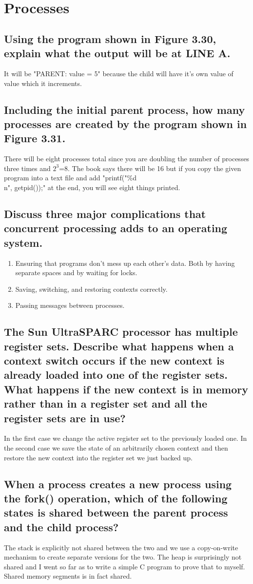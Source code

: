 \documentclass{book}%
\begin{document}
\chapter{Processes}
\section{Using the program shown in Figure 3.30, explain what the output will be
at LINE A.}
It will be "PARENT: value = 5" because the child will have it's own value of 
value which it increments.
\section{Including the initial parent process, how many processes are created by
the program shown in Figure 3.31.}
There will be eight processes total since you are doubling the number of
processes three times and $2^3$=8. The book says there will be 16 but if you 
copy the given program into a text file and add "printf("\%d\\n", getpid());" at
the end, you will see eight things printed. 
\section{Discuss three major complications that concurrent processing adds to an
operating system.}
\begin{enumerate}
\item Ensuring that programs don't mess up each other's data. Both by having
separate spaces and by waiting for locks.
\item Saving, switching, and restoring contexts correctly.
\item Passing messages between processes.
\end{enumerate}
\section{The Sun UltraSPARC processor has multiple register sets. Describe what
happens when a context switch occurs if the new context is already loaded into
one of the register sets. What happens if the new context is in memory rather
than in a register set and all the register sets are in use?}
In the first case we change the active register set to the previously loaded 
one. In the second case we save the state of an arbitrarily chosen context and 
then restore the new context into the register set we just backed up.
\section{When a process creates a new process using the fork() operation, which 
of the following states is shared between the parent process and the child 
process?}
The stack is explicitly not shared between the two and we use a copy-on-write 
mechanism to create separate versions for the two. The heap is surprisingly not 
shared and I went so far as to write a simple C program to prove that to myself.
Shared memory segments is in fact shared.
\end{document}
